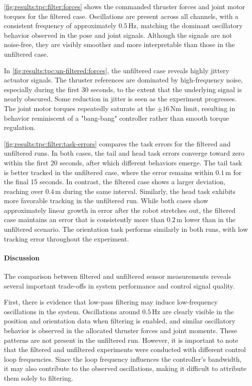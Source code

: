 \autoref{fig:results:tpc:filter:forces} shows the commanded thruster forces and joint motor torques for the filtered case. Oscillations are present across all channels, with a consistent frequency of approximately \(0.5\,\mathrm{Hz}\), matching the dominant oscillatory behavior observed in the pose and joint signals. Although the signals are not noise-free, they are visibly smoother and more interpretable than those in the unfiltered case.

In \autoref{fig:results:tpc:un-filtered:forces}, the unfiltered case reveals highly jittery actuator signals. The thruster references are dominated by high-frequency noise, especially during the first 30 seconds, to the extent that the underlying signal is nearly obscured. Some reduction in jitter is seen as the experiment progresses. The joint motor torques repeatedly saturate at the \(\pm 16\,\mathrm{Nm}\) limit, resulting in behavior reminiscent of a "bang-bang" controller rather than smooth torque regulation.

\autoref{fig:results:tpc:filter:task-errors} compares the task errors for the filtered and unfiltered runs. In both cases, the tail and head task errors converge toward zero within the first 20 seconds, after which different behaviors emerge. The tail task is better tracked in the unfiltered case, where the error remains within \(0.1\,\mathrm{m}\) for the final 15 seconds. In contrast, the filtered case shows a larger deviation, reaching over \(0.4\,\mathrm{m}\) during the same interval. Similarly, the head task exhibits more favorable tracking in the unfiltered run. While both cases show approximately linear growth in error after the robot stretches out, the filtered case maintains an error that is consistently more than \(0.2\,\mathrm{m}\) lower than in the unfiltered scenario.
The orientation task performs similarly in both runs, with low tracking error throughout the experiment.


\paragraph{Discussion}
The comparison between filtered and unfiltered sensor measurements reveals several important trade-offs in system performance and control signal quality.

First, there is evidence that low-pass filtering may induce low-frequency oscillations in the system. Oscillations around \(0.5\,\mathrm{Hz}\) are clearly visible in the position and orientation data when filtering is enabled, and similar oscillatory behavior is observed in the allocated thruster forces and joint moments. These patterns are not present in the unfiltered run. However, it is important to note that the filtered and unfiltered experiments were conducted with different control loop frequencies. Since the loop frequency influences the controller's bandwidth, it may also contribute to the observed oscillations, making it difficult to attribute them solely to filtering.

